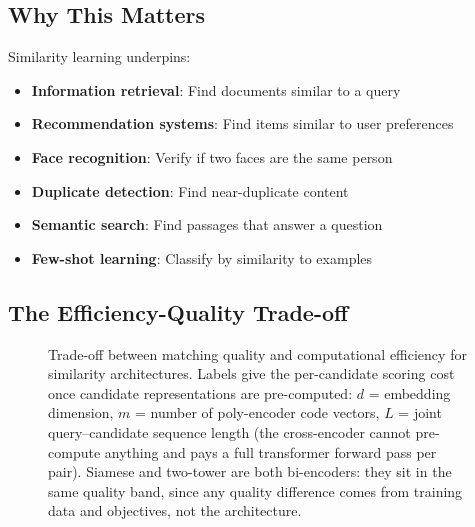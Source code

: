 \subsection{Why This Matters}

Similarity learning underpins:
\begin{itemize}
    \item \textbf{Information retrieval}: Find documents similar to a query
    \item \textbf{Recommendation systems}: Find items similar to user preferences
    \item \textbf{Face recognition}: Verify if two faces are the same person
    \item \textbf{Duplicate detection}: Find near-duplicate content
    \item \textbf{Semantic search}: Find passages that answer a question
    \item \textbf{Few-shot learning}: Classify by similarity to examples
\end{itemize}

\subsection{The Efficiency-Quality Trade-off}

\begin{figure}[H]
\centering
{}
\caption{Trade-off between matching quality and computational efficiency for similarity architectures. Labels give the per-candidate scoring cost once candidate representations are pre-computed: $d$ = embedding dimension, $m$ = number of poly-encoder code vectors, $L$ = joint query--candidate sequence length (the cross-encoder cannot pre-compute anything and pays a full transformer forward pass per pair). Siamese and two-tower are both bi-encoders: they sit in the same quality band, since any quality difference comes from training data and objectives, not the architecture.}
\label{fig:similarity_tradeoff}
\end{figure}

